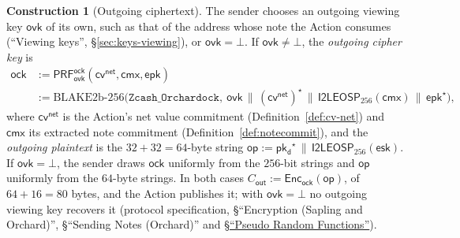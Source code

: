 \documentclass[11pt,a4paper]{article}
\theoremstyle{definition}
\newtheorem{construction}[theorem]{Construction}
\newcommand{\cmx}{\mathsf{cmx}}
\newcommand{\cvsym}{\mathsf{cv}}
\newcommand{\ovk}{\ensuremath{\mathsf{ovk}}}
\newcommand{\pkd}{\ensuremath{\mathsf{pk_d}}}
\begin{document}
\begin{construction}[Outgoing ciphertext]
The sender chooses an outgoing viewing key $\ovk$ of its own, such as that of
the address whose note the Action consumes (``Viewing keys'',
\S\ref{sec:keys-viewing}), or $\ovk = \bot$. If $\ovk \neq \bot$, the
\emph{outgoing cipher key} is
\begin{align*}
  \mathsf{ock} &:= \mathsf{PRF}^{\mathsf{ock}}_{\ovk}(\cvsym^{\mathsf{net}},
    \cmx, \mathsf{epk}) \\
  &:= \mathrm{BLAKE2b\text{-}256}\bigl(\texttt{Zcash\_Orchardock},\
    \ovk \,\|\, (\cvsym^{\mathsf{net}})^{\star} \,\|\,
    \mathsf{I2LEOSP}_{256}(\cmx) \,\|\, \mathsf{epk}^{\star}\bigr),
\end{align*}
where $\cvsym^{\mathsf{net}}$ is the Action's net value commitment
(Definition~\ref{def:cv-net}) and $\cmx$ its extracted note commitment
(Definition~\ref{def:notecommit}), and the \emph{outgoing plaintext} is the
$32 + 32 = 64$-byte string
$\mathsf{op} := \pkd^{\star} \,\|\, \mathsf{I2LEOSP}_{256}(\mathsf{esk})$.
If $\ovk = \bot$, the sender draws $\mathsf{ock}$ uniformly from the
$256$-bit strings and $\mathsf{op}$ uniformly from the $64$-byte strings. In
both cases $C_{\mathsf{out}} := \mathsf{Enc}_{\mathsf{ock}}(\mathsf{op})$, of
$64 + 16 = 80$ bytes, and the Action publishes it; with $\ovk = \bot$ no
outgoing viewing key recovers it (protocol specification, \S``Encryption
(Sapling and Orchard)'', \S``Sending Notes (Orchard)'' and
\href{https://zips.z.cash/protocol/protocol.pdf#concreteprfs}%
{\S``Pseudo Random Functions''}).
\end{construction}
\end{document}
